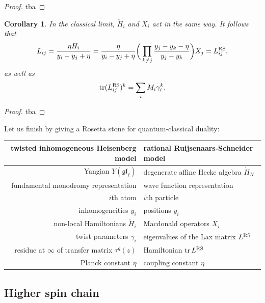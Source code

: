 \documentclass[11pt]{report}
\newtheorem{corollary}[theorem]{Corollary}
\theoremstyle{definition}
\theoremstyle{remark}
\theoremstyle{remark}
\begin{document}
\begin{proof}
tba
\end{proof}

\begin{corollary}
In the classical limit, $\check H_i$ and $X_i$ act in the same way. It follows that
\begin{equation*}
L_{ij} = \frac{\eta H_i}{y_i-y_j+\eta} = \frac{\eta}{y_i-y_j+\eta} \bigg( \prod_{k \neq j} \frac{y_j-y_k-\eta}{y_j-y_k} \bigg) X_j = L_{ij}^\textnormal{RS}.
\end{equation*}
as well as
\begin{equation*}
\operatorname{tr} (L_{ij}^\textnormal{RS})^k = \sum_i M_i \gamma_i^k.
\end{equation*}
\end{corollary}

\begin{proof}
tba
\end{proof}

Let us finish by giving a Rosetta stone for quantum-classical duality:
\begin{center}
\begin{tabular}{|r||l|}
\hline
twisted inhomogeneous Heisenberg model & rational Ruijsenaars-Schneider model \\
\hline
Yangian $Y(\mathfrak{gl}_\ell)$ & degenerate affine Hecke algebra $\dot H_N$ \\
fundamental monodromy representation & wave function representation \\
$i$th atom & $i$th particle \\
inhomogeneities $y_i$ & positions $y_i$ \\
non-local Hamiltonians $\check H_i$ & Macdonald operators $X_i$ \\
twist parameters $\gamma_i$ & eigenvalues of the Lax matrix $L^\textnormal{RS}$ \\
residue at $\infty$ of transfer matrix $\tau^g(z)$ & Hamiltonian $\operatorname{tr} L^\textnormal{RS}$ \\
Planck constant $\eta$ & coupling constant $\eta$ \\
\hline
\end{tabular}
\end{center}

\subsection{Higher spin chain}
\end{document}
